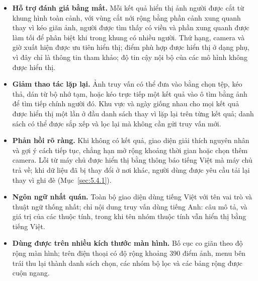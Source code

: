 \begin{itemize}
    \item \textbf{Hỗ trợ đánh giá bằng mắt.} Mỗi kết quả hiển thị ảnh người được cắt từ khung hình toàn cảnh, với vùng cắt nới rộng bằng phần cảnh xung quanh thay vì kéo giãn ảnh, người được tìm thấy có viền và phần xung quanh được làm tối để phân biệt khi trong khung có nhiều người. Thứ hạng, camera và giờ xuất hiện được ưu tiên hiển thị; điểm phù hợp được hiển thị ở dạng phụ, vì đây chỉ là thông tin tham khảo; độ tin cậy nội bộ của các mô hình không được hiển thị.
    \item \textbf{Giảm thao tác lặp lại.} Ảnh truy vấn có thể đưa vào bằng chọn tệp, kéo thả, dán từ bộ nhớ tạm, hoặc kéo trực tiếp một kết quả vào ô tìm bằng ảnh để tìm tiếp chính người đó. Khu vực và ngày giống nhau cho mọi kết quả được hiển thị một lần ở đầu danh sách thay vì lặp lại trên từng kết quả; danh sách có thể được sắp xếp và lọc lại mà không cần gửi truy vấn mới.
    \item \textbf{Phản hồi rõ ràng.} Khi không có kết quả, giao diện giải thích nguyên nhân và gợi ý cách tiếp tục, chẳng hạn mở rộng khoảng thời gian hoặc chọn thêm camera. Lỗi từ máy chủ được hiển thị bằng thông báo tiếng Việt mà máy chủ trả về; khi dữ liệu đã bị thay đổi ở nơi khác, người dùng được yêu cầu tải lại thay vì ghi đè (Mục~\ref{sec:5.4.1}).
    \item \textbf{Ngôn ngữ nhất quán.} Toàn bộ giao diện dùng tiếng Việt với tên vai trò và thuật ngữ thống nhất; chỉ nội dung truy vấn dùng tiếng Anh: câu mô tả, và giá trị của các thuộc tính, trong khi tên nhóm thuộc tính vẫn hiển thị bằng tiếng Việt.
    \item \textbf{Dùng được trên nhiều kích thước màn hình.} Bố cục co giãn theo độ rộng màn hình; trên điện thoại có độ rộng khoảng 390 điểm ảnh, menu bên trái thu lại thành danh sách chọn, các nhóm bộ lọc và các bảng rộng được cuộn ngang.
\end{itemize}
